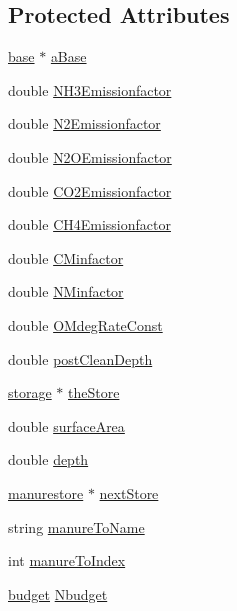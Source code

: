\subsection*{Protected Attributes}
\begin{DoxyCompactItemize}
\item 
\hyperlink{classbase}{base} $\ast$ \hyperlink{classmanurestore_ac06eabf69498124decf382a8a373fae3}{aBase}
\item 
double \hyperlink{classmanurestore_abf76a878ba843ac1a77dcfad7b413d37}{NH3Emissionfactor}
\item 
double \hyperlink{classmanurestore_a02b104f571b0cfa311217ba14f7981cc}{N2Emissionfactor}
\item 
double \hyperlink{classmanurestore_a44dc0cae704de2cd571445e1e2490bb1}{N2OEmissionfactor}
\item 
double \hyperlink{classmanurestore_a6ee1052f18936c909652548b28e2a66e}{CO2Emissionfactor}
\item 
double \hyperlink{classmanurestore_a9861c836c977df3bf4e245d099322e6b}{CH4Emissionfactor}
\item 
double \hyperlink{classmanurestore_a7326d58aaa8a595756ae61121708aa92}{CMinfactor}
\item 
double \hyperlink{classmanurestore_a75de8d810402cd1d65a1ce4ec9414480}{NMinfactor}
\item 
double \hyperlink{classmanurestore_ac2155ea6f170c51b86b20f809ead9502}{OMdegRateConst}
\item 
double \hyperlink{classmanurestore_a8e380412792126807f34460d47fca98b}{postCleanDepth}
\item 
\hyperlink{classstorage}{storage} $\ast$ \hyperlink{classmanurestore_a190469ebea4c87d3d641c73a1626c5e3}{theStore}
\item 
double \hyperlink{classmanurestore_a061d3a49dadcf3d8de36417c7cf125d3}{surfaceArea}
\item 
double \hyperlink{classmanurestore_a402560a3c76e913b8be315a6b87ee9fd}{depth}
\item 
\hyperlink{classmanurestore}{manurestore} $\ast$ \hyperlink{classmanurestore_a8898189fbaeb7e121a06d09288ff819b}{nextStore}
\item 
string \hyperlink{classmanurestore_a349304f98a8168e23da714f55c4afe6c}{manureToName}
\item 
int \hyperlink{classmanurestore_a47334161976431479652942c518c0bcf}{manureToIndex}
\item 
\hyperlink{classbudget}{budget} \hyperlink{classmanurestore_a2f3e8e453b648c3a34c013fc7dc230b3}{Nbudget}

\end{DoxyCompactItemize}
